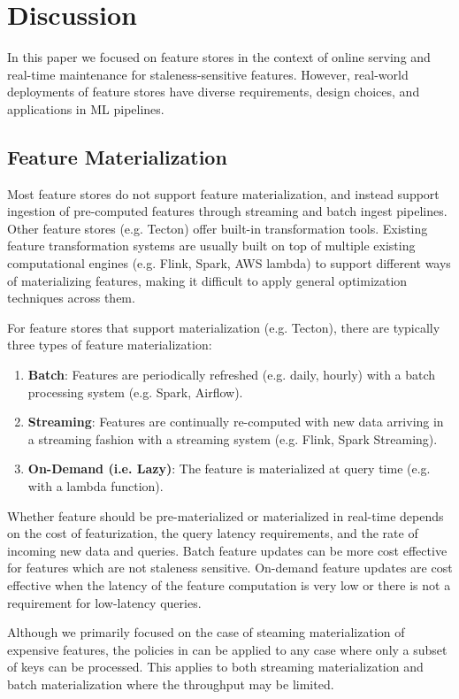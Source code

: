 \section{Discussion}
\label{s:discussion}
In this paper we focused on feature stores in the context of online serving and real-time maintenance for staleness-sensitive features. However, real-world deployments of feature stores have diverse requirements, design choices, and applications in ML pipelines. 

\subsection{Feature Materialization}

Most feature stores do not support feature materialization, and instead support ingestion of pre-computed features through streaming and batch ingest pipelines. Other feature stores (e.g. Tecton) offer built-in transformation tools. Existing feature transformation systems are usually built on top of multiple existing computational engines (e.g. Flink, Spark, AWS lambda) to support different ways of materializing features, making it difficult to apply general optimization techniques across them.

For feature stores that support materialization (e.g. Tecton), there are typically three types of feature materialization: 
\begin{enumerate}
    \item \textbf{Batch}: Features are periodically refreshed (e.g. daily, hourly) with a batch processing system (e.g. Spark, Airflow). 
    \item \textbf{Streaming}: Features are continually re-computed with new data arriving in a streaming fashion with a streaming system (e.g. Flink, Spark Streaming). 
    \item \textbf{On-Demand (i.e. Lazy)}: The feature is materialized at query time (e.g. with a lambda function).
\end{enumerate}
Whether feature should be pre-materialized or materialized in real-time depends on the cost of featurization, the query latency requirements, and the rate of incoming new data and queries. Batch feature updates can be more cost effective for features which are not staleness sensitive. On-demand feature updates are cost effective when the latency of the feature computation is very low or there is not a requirement for low-latency queries. 

Although we primarily focused on the case of steaming materialization of expensive features, the policies in \system{} can be applied to any case where only a subset of keys can be processed. This applies to both streaming materialization and batch materialization where the throughput may be limited. 

